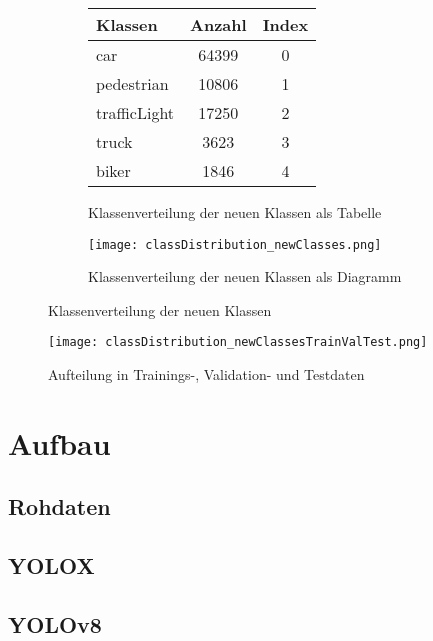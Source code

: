 \begin{figure}
	\begin{subfigure}{0.5\textwidth}
	\centering
	\begin{tabular}{l|c|c}
		\hline
		Klassen & Anzahl & Index \\
		\hline
		\hline
		car & 64399 & 0 \\
		pedestrian & 10806 & 1 \\
		trafficLight & 17250 & 2 \\
		truck & 3623 & 3 \\
		biker & 1846 & 4 \\
		\hline
	\end{tabular}
	\caption{Klassenverteilung der neuen Klassen als Tabelle}
	\label{tab:classDistributionNewClasses}
	\end{subfigure}
	\begin{subfigure}{0.5\textwidth}
		\centering
		\texttt{[image: classDistribution\_newClasses.png]}
		\caption{Klassenverteilung der neuen Klassen als Diagramm}
		\label{fig:classDistributionNewClasses_graph}
	\end{subfigure}
	\caption{Klassenverteilung der neuen Klassen}
	\label{fig:classDistributionNewClasses}
\end{figure}

\begin{figure}
	\centering
		\texttt{[image: classDistribution\_newClassesTrainValTest.png]}
		\caption{Aufteilung in Trainings-, Validation- und Testdaten}
		\label{fig:datasetTrainValTestSplit}
\end{figure}


\section{Aufbau}
\subsection{Rohdaten}



\subsection{YOLOX}




\subsection{YOLOv8}




